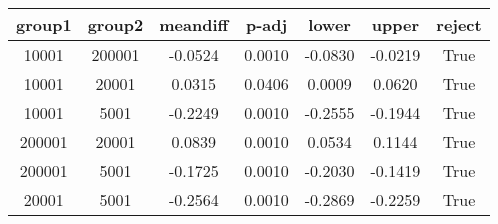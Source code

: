 \begin{tabular}{|c|c|c|c|c|c|c|}
\toprule
 group1 &  group2 &  meandiff &   p-adj &   lower &   upper &  reject \\
\midrule
  10001 &  200001 &   -0.0524 &  0.0010 & -0.0830 & -0.0219 &    True \\
  10001 &   20001 &    0.0315 &  0.0406 &  0.0009 &  0.0620 &    True \\
  10001 &    5001 &   -0.2249 &  0.0010 & -0.2555 & -0.1944 &    True \\
 200001 &   20001 &    0.0839 &  0.0010 &  0.0534 &  0.1144 &    True \\
 200001 &    5001 &   -0.1725 &  0.0010 & -0.2030 & -0.1419 &    True \\
  20001 &    5001 &   -0.2564 &  0.0010 & -0.2869 & -0.2259 &    True \\
\bottomrule
\end{tabular}
